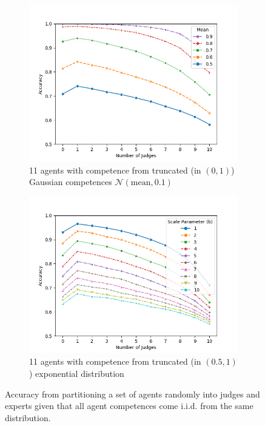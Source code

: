 \documentclass[letterpaper]{article} %
\begin{document}
\begin{figure}[t]
\begin{subfigure}{0.3\textwidth}
\label{fig:11_uniform}
\end{subfigure}
\hfill
\begin{subfigure}{0.3\textwidth}
 \includegraphics[width=\textwidth]{./Figures/Experiment2_Gaussian/Experiment2_gaussian_01sd_11agents_numjudges_vs_accuracy_compare_mean.png}
 \caption{11 agents with competence from truncated (in $(0,1)$) Gaussian competences $\mathcal{N}(\text{mean},0.1)$}
 \label{fig:11_gauss}
\end{subfigure}
\hfill
\begin{subfigure}{0.3\textwidth}
 \includegraphics[width=\textwidth]{./Figures/Experiment2_Exponential/Experiment2_exponential_11agents_numjudges_vs_accuracy_compare_b.png}
 \caption{11 agents with competence from truncated (in $(0.5,1)$) exponential distribution}
\label{fig:11_exponential}
\end{subfigure}
\caption{Accuracy from partitioning a set of agents randomly into judges and experts given that all agent competences come i.i.d. from the same distribution.%
}
\label{fig:partition}
\end{figure}
\end{document}
